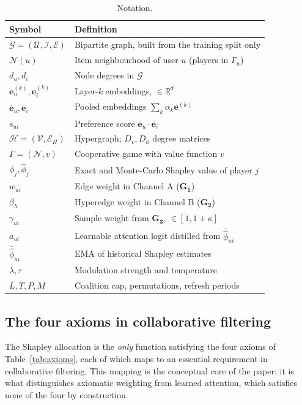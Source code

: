 \documentclass[final,5p,times,twocolumn]{elsarticle}
\begin{document}
\begin{table}[t]
\centering
\caption{Notation.}
\label{tab:notation}
\footnotesize
\begin{tabular}{ll}
\toprule
\textbf{Symbol} & \textbf{Definition} \\
\midrule
$\mathcal{G}=(\mathcal{U},\mathcal{I},\mathcal{E})$ & Bipartite graph, built
from the training split only \\
$\mathcal{N}(u)$ & Item neighbourhood of user $u$ (players in $\Gamma_u$) \\
$d_u, d_i$ & Node degrees in $\mathcal{G}$ \\
$\mathbf{e}^{(k)}_u,\mathbf{e}^{(k)}_i$ & Layer-$k$ embeddings,
$\in\mathbb{R}^{d}$ \\
$\bar{\mathbf{e}}_u,\bar{\mathbf{e}}_i$ & Pooled embeddings
$\sum_{k}\alpha_k\mathbf{e}^{(k)}$ \\
$s_{ui}$ & Preference score
$\bar{\mathbf{e}}_u \cdot \bar{\mathbf{e}}_i$ \\
$\mathcal{H}=(\mathcal{V},\mathcal{E}_H)$ & Hypergraph; $D_v,D_h$ degree
matrices \\
$\Gamma=(\mathcal{N},v)$ & Cooperative game with value function $v$ \\
$\phi_j,\hat{\phi}_j$ & Exact and Monte-Carlo Shapley value of player $j$ \\
$w_{ui}$ & Edge weight in Channel A ($\mathbf{G_1}$) \\
$\beta_h$ & Hyperedge weight in Channel B ($\mathbf{G_2}$) \\
$\gamma_{ui}$ & Sample weight from $\mathbf{G_3}$, $\in[1,1+\kappa]$ \\
$a_{ui}$ & Learnable attention logit distilled from
$\bar{\hat{\phi}}_{ui}$ \\
$\bar{\hat{\phi}}_{ui}$ & EMA of historical Shapley estimates \\
$\lambda,\tau$ & Modulation strength and temperature \\
$L,T,P,M$ & Coalition cap, permutations, refresh periods \\
\bottomrule
\end{tabular}
\end{table}

\subsection{The four axioms in collaborative filtering}
\label{sec:axioms}

The Shapley allocation is the \emph{only} function satisfying the four axioms
of Table~\ref{tab:axioms}, each of which maps to an essential requirement in
collaborative filtering. This mapping is the conceptual core of the paper: it
is what distinguishes axiomatic weighting from learned attention, which
satisfies none of the four by construction.
\end{document}
